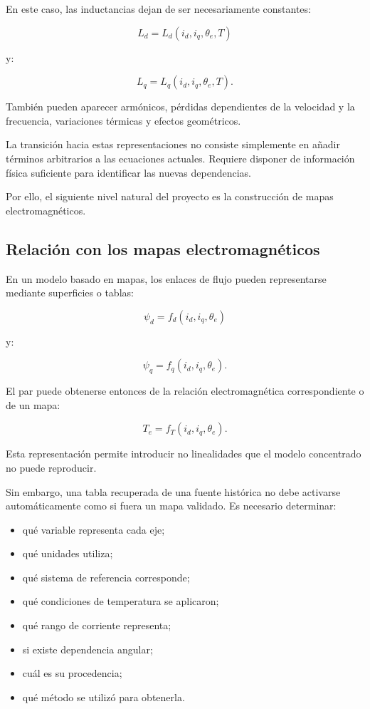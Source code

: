 En este caso, las inductancias dejan de ser necesariamente constantes:

\begin{equation}
L_d
=
L_d(i_d,i_q,\theta_e,T)
\end{equation}

y:

\begin{equation}
L_q
=
L_q(i_d,i_q,\theta_e,T).
\end{equation}

También pueden aparecer armónicos, pérdidas dependientes de la velocidad y la frecuencia, variaciones térmicas y efectos geométricos.

La transición hacia estas representaciones no consiste simplemente en añadir términos arbitrarios a las ecuaciones actuales. Requiere disponer de información física suficiente para identificar las nuevas dependencias.

Por ello, el siguiente nivel natural del proyecto es la construcción de mapas electromagnéticos.

\subsection{Relación con los mapas electromagnéticos}

En un modelo basado en mapas, los enlaces de flujo pueden representarse mediante superficies o tablas:

\begin{equation}
\psi_d=f_d(i_d,i_q,\theta_e)
\end{equation}

y:

\begin{equation}
\psi_q=f_q(i_d,i_q,\theta_e).
\end{equation}

El par puede obtenerse entonces de la relación electromagnética correspondiente o de un mapa:

\begin{equation}
T_e=f_T(i_d,i_q,\theta_e).
\end{equation}

Esta representación permite introducir no linealidades que el modelo concentrado no puede reproducir.

Sin embargo, una tabla recuperada de una fuente histórica no debe activarse automáticamente como si fuera un mapa validado. Es necesario determinar:

\begin{itemize}
    \item qué variable representa cada eje;
    \item qué unidades utiliza;
    \item qué sistema de referencia corresponde;
    \item qué condiciones de temperatura se aplicaron;
    \item qué rango de corriente representa;
    \item si existe dependencia angular;
    \item cuál es su procedencia;
    \item qué método se utilizó para obtenerla.
\end{itemize}

